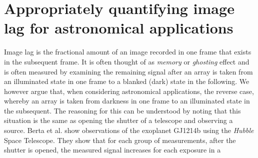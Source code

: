 \documentclass[a4paper]{spie}
\begin{document}
\section{Appropriately quantifying image lag for astronomical applications}\label{sec:lag}
Image lag is the fractional amount of an image recorded in one frame that exists in the subsequent frame. It is often thought of as \textit{memory} or \textit{ghosting} effect and is often measured by examining the remaining signal after an array is taken from an illuminated state in one frame to a blanked (dark) state in the following. We however argue that, when considering astronomical applications, the reverse case, whereby an array is taken from darkness in one frame to an illuminated state in the subsequent. The reasoning for this can be understood by noting that this situation is the same as opening the shutter of a telescope and observing a source. Berta et al.\cite{Berta2012} show observations of the exoplanet GJ1214b using the \textit{Hubble} Space Telescope. They show that for each group of measurements, after the shutter is opened, the measured signal increases for each exposure in a 



\end{document}
